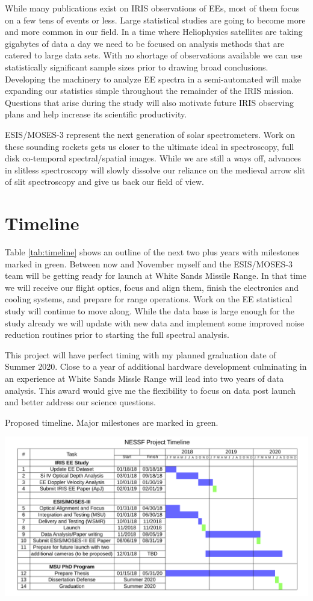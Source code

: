 \documentclass[]{aastex6}
\begin{document}
While many publications exist on IRIS observations of EEs, most of them focus on a few tens of events or less. Large statistical studies are going to become more and more common in our field.  In a time where Heliophysics satellites are taking gigabytes of data a day we need to be focused on analysis methods that are catered to large data sets.  With no shortage of observations available we can use statistically significant sample sizes prior to drawing broad conclusions. Developing the machinery to analyze EE spectra in a semi-automated will make expanding our statistics simple throughout the remainder of the IRIS mission.  Questions that arise during the study will also motivate future IRIS observing plans and help increase its scientific productivity.

ESIS/MOSES-3 represent the next generation of solar spectrometers.  Work on these sounding rockets gets us closer to the ultimate ideal in spectroscopy, full disk co-temporal spectral/spatial images.  While we are still a ways off, advances in slitless spectroscopy will slowly dissolve our reliance on the medieval arrow slit of slit spectroscopy and give us back our field of view.



 
\section{Timeline}
Table \ref{tab:timeline} shows an outline of the next two plus years with milestones marked in green. Between now and November myself and the ESIS/MOSES-3 team will be getting ready for launch at White Sands Missile Range.  In that time we will receive our flight optics, focus and align them, finish the electronics and cooling systems, and prepare for range operations.  Work on the EE statistical study will continue to move along.  While the data base is large enough for the study already we will update with new data and implement some improved noise reduction routines prior to starting the full spectral analysis.  

This project will have perfect timing with my planned graduation date of Summer 2020.  Close to a year of additional hardware development culminating in an experience at White Sands Missle Range will lead into two years of data analysis.  This award would give me the flexibility to focus on data post launch and better address our science questions.  






\begin{table}[b]
	\caption{Proposed timeline.  Major milestones are marked in green.}
	\centerline{\includegraphics[scale=.8]{NESSF2018_Timeline_Cropped.pdf}}
	\label{tab:timeline}
	
\end{table}	
	
\end{document}
